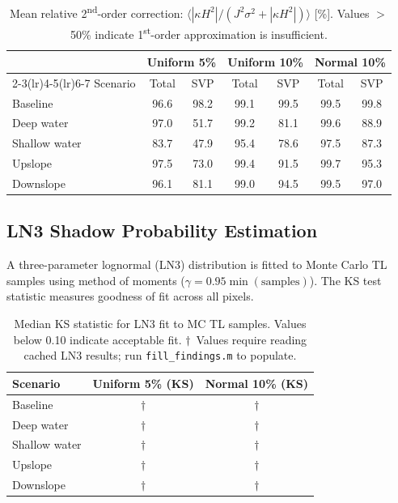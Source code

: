 \documentclass[11pt,a4paper]{article}
\begin{document}
\begin{table}[H]
  \centering
  \caption{Mean relative 2\textsuperscript{nd}-order correction:
           $\langle|\kappa H^2|/(J^2\sigma^2 + |\kappa H^2|)\rangle$ [\%].
           Values $>$50\% indicate 1\textsuperscript{st}-order approximation is insufficient.}
  \label{tab:2nd_order_correction}
  \begin{tabular}{lcccccc}
    \toprule
    & \multicolumn{2}{c}{Uniform 5\%} & \multicolumn{2}{c}{Uniform 10\%}
    & \multicolumn{2}{c}{Normal 10\%} \\
    \cmidrule(lr){2-3}\cmidrule(lr){4-5}\cmidrule(lr){6-7}
    Scenario & Total & SVP & Total & SVP & Total & SVP \\
    \midrule
    Baseline      & 96.6 & 98.2 & 99.1 & 99.5 & 99.5 & 99.8 \\
    Deep water    & 97.0 & 51.7 & 99.2 & 81.1 & 99.6 & 88.9 \\
    Shallow water & 83.7 & 47.9 & 95.4 & 78.6 & 97.5 & 87.3 \\
    Upslope       & 97.5 & 73.0 & 99.4 & 91.5 & 99.7 & 95.3 \\
    Downslope     & 96.1 & 81.1 & 99.0 & 94.5 & 99.5 & 97.0 \\
    \bottomrule
  \end{tabular}
\end{table}

\subsection{LN3 Shadow Probability Estimation}
\label{sec:ln3}

A three-parameter lognormal (LN3) distribution is fitted to Monte Carlo TL samples
using method of moments ($\gamma = 0.95 \min(\text{samples})$).
The KS test statistic measures goodness of fit across all pixels.

\begin{table}[H]
  \centering
  \caption{Median KS statistic for LN3 fit to MC TL samples.
           Values below 0.10 indicate acceptable fit.
           $\dagger$~Values require reading cached LN3 results; run \texttt{fill\_findings.m}
           to populate.}
  \label{tab:ks_ln3}
  \begin{tabular}{lcc}
    \toprule
    Scenario & Uniform 5\% (KS) & Normal 10\% (KS) \\
    \midrule
    Baseline      & $\dagger$ & $\dagger$ \\
    Deep water    & $\dagger$ & $\dagger$ \\
    Shallow water & $\dagger$ & $\dagger$ \\
    Upslope       & $\dagger$ & $\dagger$ \\
    Downslope     & $\dagger$ & $\dagger$ \\
    \bottomrule
  \end{tabular}
\end{table}
\end{document}
